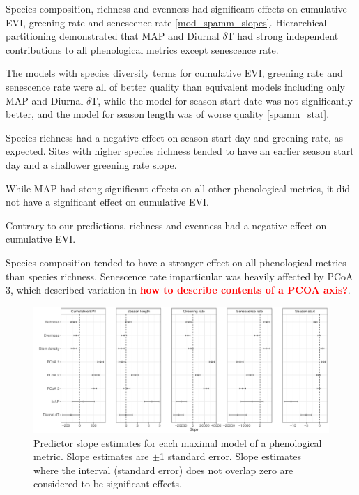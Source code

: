 \documentclass[11pt,a4paper]{article}
\newcommand{\todo}[1]{\textcolor{red}{\textbf{#1}}}   %
\begin{document}
Species composition, richness and evenness had significant effects on cumulative EVI, greening rate and senescence rate \autoref{mod_spamm_slopes}. Hierarchical partitioning demonstrated that MAP and Diurnal $\delta$T had strong independent contributions to all phenological metrics except senescence rate. 

The models with species diversity terms for cumulative EVI, greening rate and senescence rate were all of better quality than equivalent models including only MAP and Diurnal $\delta$T, while the model for season start date was not significantly better, and the model for season length was of worse quality \autoref{spamm_stat}. 

Species richness had a negative effect on season start day and greening rate, as expected. Sites with higher species richness tended to have an earlier season start day and a shallower greening rate slope. 

While MAP had stong significant effects on all other phenological metrics, it did not have a significant effect on cumulative EVI.

Contrary to our predictions, richness and evenness had a negative effect on cumulative EVI.

Species composition tended to have a stronger effect on all phenological metrics than species richness. Senescence rate imparticular was heavily affected by PCoA 3, which described variation in \todo{how to describe contents of a PCOA axis?}.



 

\begin{figure}[H]
\centering
	\includegraphics[width=\textwidth]{mod_spamm_slopes.pdf}
	\caption{Predictor slope estimates for each maximal model of a phenological metric. Slope estimates are $\pm$1 standard error. Slope estimates where the interval (standard error) does not overlap zero are considered to be significant effects.}
	\label{mod_spamm_slopes}
\end{figure}
\end{document}

